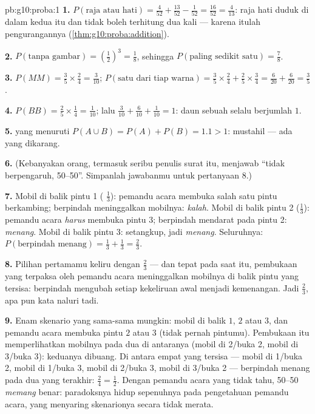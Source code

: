 \begin{solution}{pb:g10:proba:1}
\textbf{1.} $P(\text{raja atau hati}) = \frac{4}{52} +
\frac{13}{52} - \frac{1}{52} = \frac{16}{52} = \frac{4}{13}$:
raja hati duduk di dalam kedua  itu dan tidak boleh terhitung
dua kali --- karena itulah pengurangannya
(\cref{thm:g10:proba:addition}).

\textbf{2.} $P(\text{tanpa gambar}) = \left(\frac12\right)^3 =
\frac18$, sehingga $P(\text{paling sedikit satu}) = \frac78$.

\textbf{3.} $P(MM) = \frac35 \times \frac24 = \frac{3}{10}$;
$P(\text{satu dari tiap warna}) = \frac35 \times \frac24 + \frac25
\times \frac34 = \frac{6}{20} + \frac{6}{20} = \frac35$.

\textbf{4.} $P(BB) = \frac25 \times \frac14 = \frac1{10}$; lalu
$\frac{3}{10} + \frac{6}{10} + \frac{1}{10} = 1$: daun sebuah
 selalu berjumlah $1$.

\textbf{5.}  yang  menuruti $P(A \cup B) = P(A) +
P(B) = 1.1 > 1$: mustahil --- ada  yang dikarang.

\textbf{6.} (Kebanyakan orang, termasuk seribu penulis surat itu,
menjawab ``tidak berpengaruh, 50--50''. Simpanlah jawabanmu untuk
pertanyaan 8.)

\textbf{7.} Mobil di balik pintu 1 ( $\frac13$): pemandu acara
membuka salah satu pintu berkambing; berpindah meninggalkan mobilnya:
\emph{kalah}. Mobil di balik pintu 2 ($\frac13$): pemandu acara \emph{harus}
membuka pintu 3; berpindah mendarat pada pintu 2: \emph{menang}. Mobil di
balik pintu 3: setangkup, jadi \emph{menang}. Seluruhnya:
$P(\text{berpindah menang}) = \frac13 + \frac13 = \frac23$.

\textbf{8.} Pilihan pertamamu keliru dengan 
$\frac23$ --- dan tepat pada saat itu, pembukaan yang terpaksa oleh pemandu
acara meninggalkan mobilnya di balik pintu yang tersisa: berpindah mengubah
setiap kekeliruan awal menjadi kemenangan. Jadi $\frac23$, apa pun kata
naluri tadi.

\textbf{9.} Enam skenario yang sama-sama mungkin: mobil di balik $1$, $2$
atau $3$, dan pemandu acara membuka pintu $2$ atau $3$ (tidak pernah
pintumu). Pembukaan itu memperlihatkan mobilnya pada dua di antaranya
(mobil di 2/buka 2, mobil di 3/buka 3): keduanya dibuang. Di antara empat
yang tersisa --- mobil di 1/buka 2, mobil di 1/buka 3, mobil di 2/buka 3,
mobil di 3/buka 2 --- berpindah menang pada dua yang terakhir:
$\frac24 = \frac12$. Dengan pemandu acara yang tidak tahu, 50--50 \emph{memang}
benar: paradoksnya hidup sepenuhnya pada pengetahuan pemandu acara, yang
menyaring skenarionya secara tidak merata.


\end{solution}
